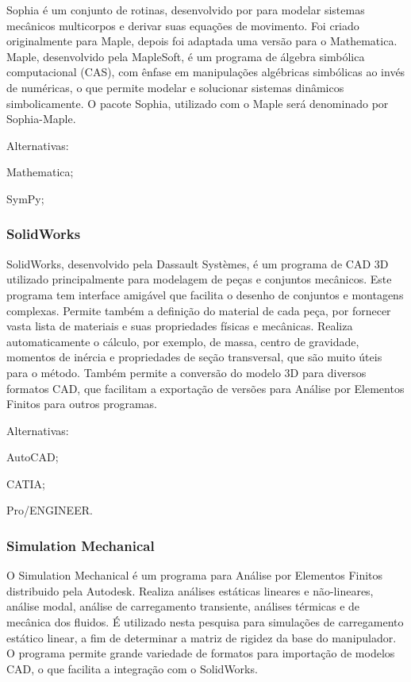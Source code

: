 Sophia é um conjunto de rotinas, desenvolvido por \citet{lesser1995analysis}
para modelar sistemas mecânicos multicorpos e derivar suas equações de
movimento. Foi criado originalmente para Maple, depois foi adaptada uma
versão para o Mathematica.
Maple\cite{maple}, desenvolvido pela MapleSoft, é um programa de álgebra
simbólica computacional (CAS), com ênfase em manipulações algébricas simbólicas
ao invés de numéricas, o que permite modelar e solucionar sistemas dinâmicos
simbolicamente. O pacote Sophia, utilizado com o Maple será denominado por
Sophia-Maple.

Alternativas:
%
\begin{enumerate*}
	\item Mathematica;
	\item SymPy;
\end{enumerate*}

\subsubsection{SolidWorks}

SolidWorks\cite{solidworks}, desenvolvido pela Dassault Systèmes, é um programa
de CAD 3D utilizado principalmente para modelagem de peças e conjuntos mecânicos.
Este programa tem interface amigável que facilita o desenho de conjuntos e
montagens complexas. Permite também a definição do material de cada peça, por
fornecer vasta lista de materiais e suas propriedades físicas e mecânicas.
Realiza automaticamente o cálculo, por exemplo, de massa, centro de
gravidade, momentos de inércia e propriedades de seção transversal, que são
muito úteis para o método. Também permite a conversão do modelo 3D para diversos
formatos CAD, que facilitam a exportação de versões para Análise por Elementos
Finitos para outros programas.

Alternativas:
%
\begin{enumerate*}
	\item AutoCAD;
	\item CATIA;
	\item Pro/ENGINEER.
\end{enumerate*}

\subsubsection{Simulation Mechanical}

O Simulation Mechanical\cite{autodesk} é um programa para Análise por Elementos
Finitos distribuido pela Autodesk.  Realiza análises estáticas lineares e não-lineares,
análise modal, análise de carregamento transiente, análises térmicas e de
mecânica dos fluidos.
É utilizado nesta pesquisa para simulações de carregamento estático linear, a
fim de determinar a matriz de rigidez da base do manipulador. O programa permite
grande variedade de formatos para importação de modelos CAD, o que facilita a
integração com o SolidWorks.

